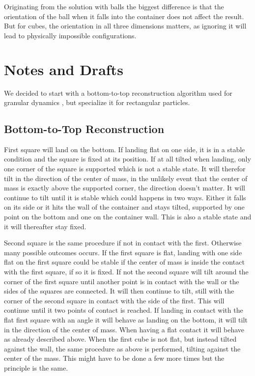 \documentclass[12pt, sumlimits, intlimits]{article}
\begin{document}
Originating from the solution with balls the biggest difference is that the orientation of the ball when it falls into the container does not affect the result. But for cubes, the orientation in all three dimensions matters, as ignoring it will lead to physically impossible configurations.

\section{Notes and Drafts}

We decided to start with a bottom-to-top reconstruction algorithm used
for granular dynamics \cite{poschel-2005},
but specialize it for rectangular particles.

\subsection{Bottom-to-Top Reconstruction}
First square will land on the bottom. If landing flat on one side, it is in a stable condition and the square is fixed at its position. If at all tilted when landing, only one corner of the square is supported which is not a stable state. It will therefor tilt in the direction of the center of mass, in the unlikely event that the center of mass is exactly above the supported corner, the direction doesn't matter. It will continue to tilt until it is stable which could happens in two ways. Either it falls on its side or it hits the wall of the container and stays tilted, supported by one point on the bottom and one on the container wall. This is also a stable state and it will thereafter stay fixed.

Second square is the same procedure if not in contact with the first. Otherwise many possible outcomes occurs. If the first square is flat, landing with one side flat on the first square could be stable if the center of mass is inside the contact with the first square, if so it is fixed. If not the second square will tilt around the corner of the first square until another point is in contact with the wall or the sides of the squares are connected. It will then continue to tilt, still with the corner of the second square in contact with the side of the first. This will continue until it two points of contact is reached.
If landing in contact with the flat first square with an angle it will behave as landing on the bottom, it will tilt in the direction of the center of mass. When having a flat contact it will behave as already described above.
When the first cube is not flat, but instead tilted against the wall, the same procedure as above is performed, tilting against the center of the mass. This might have to be done a few more times but the principle is the same.
\end{document}
